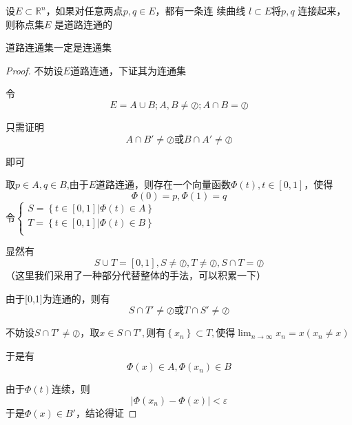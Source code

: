 \documentclass[lang=cn,10pt]{elegantbook}
\begin{document}
\begin{definition}
	设$E\subset  \mathbb{R} ^n$，如果对任意两点$ p, q \in E$，都有一条连
	续曲线 $l \subset E $将$ p, q$ 连接起来，则称点集$ E$ 是道路连通的
\end{definition}
\begin{theorem}
	道路连通集一定是连通集
\end{theorem}
\begin{proof}
	
	不妨设$E$道路连通，下证其为连通集
	
	令\begin{equation*}
		E=A\cup B;A,B\ne \oslash ;A\cap B=\oslash 
	\end{equation*}
	
	只需证明
	\begin{equation*}
		A\cap B'\ne\oslash\text{或}B\cap A'\ne\oslash
	\end{equation*}
	
	即可
	
	取$p\in A,q\in B$,由于$E$道路连通，则存在一个向量函数$\Phi \left( t \right) ,t\in \left[ 0,1 \right] $，使得
	\begin{equation*}
		\Phi \left( 0 \right)=p,\Phi \left( 1 \right)=q
	\end{equation*}
	令$\begin{cases}
		S=\left\{ t\in \left[ 0,1 \right] |\Phi \left( t \right) \in A \right\}\\
		T=\left\{ t\in \left[ 0,1 \right] |\Phi \left( t \right) \in B \right\}\\
	\end{cases}$
	
	显然有
	\begin{equation*}
		S\cup T=\left[ 0,1 \right] ,S\ne \oslash ,T\ne \oslash ,S\cap T=\oslash 
	\end{equation*}
	（这里我们采用了一种部分代替整体的手法，可以积累一下）
	
	由于[0,1]为连通的，则有
	\begin{equation*}
			S\cap T'\ne\oslash\text{或}T\cap S'\ne\oslash
	\end{equation*}
	
	不妨设$S\cap T'\ne \oslash \text{，取}x\in S\cap T',\text{则有}\left\{ x_n \right\} \subset T,\text{使得}\lim_{n\rightarrow \infty} x_n=x\left( x_n\ne x \right)$ 
	
	于是有
	\begin{equation*}
		\Phi \left( x \right)\in A,\Phi \left( x_{n} \right)\in B
	\end{equation*}
	
	由于$\Phi \left( t \right)$连续，则
	\begin{equation*}
		|\Phi\left( x_{n} \right)-\Phi \left( x \right)|<\varepsilon
	\end{equation*}
	于是$\Phi \left( x \right)\in B'$，结论得证
\end{proof}
\end{document}
